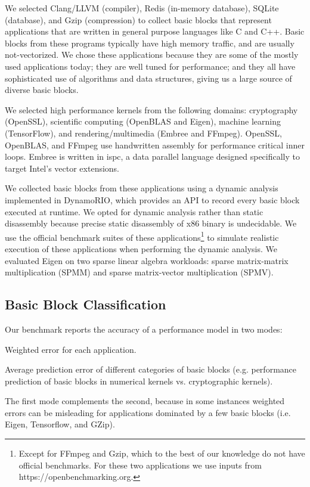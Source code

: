 We selected Clang/LLVM\cite{llvm} (compiler),
Redis (in-memory database), SQLite (database), and Gzip (compression)
to collect basic blocks that represent
applications that are written in general purpose languages
like C and C++.
Basic blocks from these programs
typically have high memory traffic, and are usually not-vectorized.
We chose these applications because they are some of the mostly used
applications today; they are well tuned for performance;
and they all have sophisticated use of algorithms and data structures,
giving us a large source of diverse basic blocks.

We selected high performance kernels from the following domains:
cryptography (OpenSSL), scientific computing (OpenBLAS and Eigen),
machine learning (TensorFlow\cite{tensorflow}),
and rendering/multimedia (Embree\cite{embree} and FFmpeg).
OpenSSL, OpenBLAS, and FFmpeg use handwritten assembly for performance critical inner loops.
Embree is written in ispc\cite{ispc}, a data parallel language
designed specifically to target Intel's vector extensions.

We collected basic blocks from these applications using
a dynamic analysis implemented in DynamoRIO\cite{dynamorio},
which provides an API to record every basic block
executed at runtime.
We opted for dynamic analysis rather than static disassembly
because precise static disassembly of x86 binary
is undecidable.
We use the official benchmark suites of these applications\footnote{
Except for FFmpeg and Gzip, which to the best of our knowledge do not have
official benchmarks. For these two applications we use inputs
from https://openbenchmarking.org.
} to simulate realistic execution of these applications when performing
the dynamic analysis.
We evaluated Eigen on two sparse linear algebra workloads:
sparse matrix-matrix multiplication (SPMM) and 
sparse matrix-vector multiplication (SPMV).

\subsection{Basic Block Classification}\label{classification}
Our benchmark reports the accuracy of a performance model in two modes:
\begin{enumerate*}
\item Weighted error for each application.
\item Average prediction error of different categories of 
basic blocks (e.g. performance prediction
of basic blocks in numerical kernels vs.
cryptographic kernels).
\end{enumerate*}
The first mode complements the second, because in some instances
weighted errors can be misleading for applications dominated by a few basic blocks
(i.e. Eigen, Tensorflow, and GZip).


